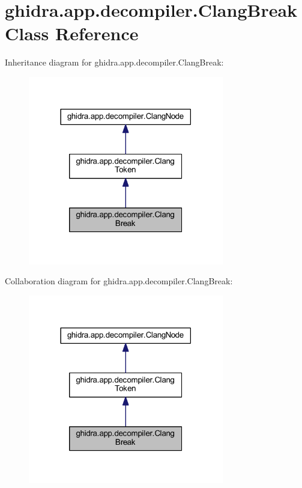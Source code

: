 \hypertarget{classghidra_1_1app_1_1decompiler_1_1_clang_break}{}\section{ghidra.\+app.\+decompiler.\+Clang\+Break Class Reference}
\label{classghidra_1_1app_1_1decompiler_1_1_clang_break}


Inheritance diagram for ghidra.\+app.\+decompiler.\+Clang\+Break\+:
\nopagebreak
\begin{figure}[H]
\begin{center}
\leavevmode
\includegraphics[width=242pt]{classghidra_1_1app_1_1decompiler_1_1_clang_break__inherit__graph}
\end{center}
\end{figure}


Collaboration diagram for ghidra.\+app.\+decompiler.\+Clang\+Break\+:
\nopagebreak
\begin{figure}[H]
\begin{center}
\leavevmode
\includegraphics[width=242pt]{classghidra_1_1app_1_1decompiler_1_1_clang_break__coll__graph}
\end{center}
\end{figure}
